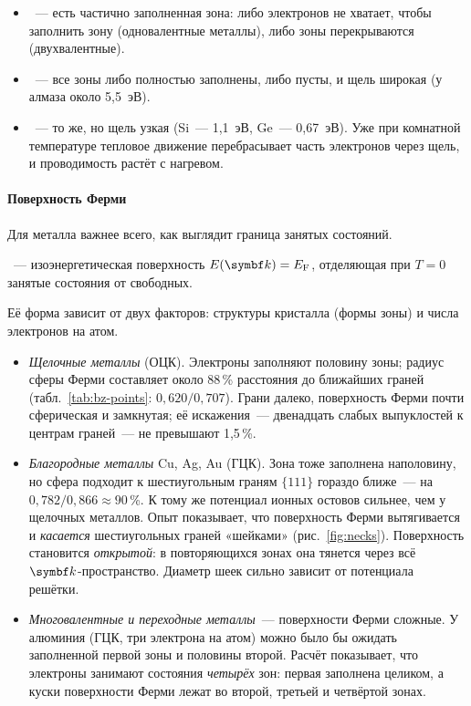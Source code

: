 \begin{itemize}
\item {}~— есть частично заполненная зона: либо электронов
не хватает, чтобы заполнить зону (одновалентные металлы), либо зоны
перекрываются (двухвалентные).
\item {}~— все зоны либо полностью заполнены, либо пусты,
и щель широкая (у алмаза около 5,5~эВ).
\item {}~— то же, но щель узкая (Si~— 1,1~эВ, Ge~—
0,67~эВ). Уже при комнатной температуре тепловое движение перебрасывает
часть электронов через щель, и проводимость растёт с нагревом.
\end{itemize}

\paragraph{Поверхность Ферми}
Для металла важнее всего, как выглядит граница занятых состояний.
\begin{opredelenie}
~— изоэнергетическая поверхность $E(\vb k)=\EF$,
отделяющая при $T=0$ занятые состояния от свободных.
\end{opredelenie}
Её форма зависит от двух факторов: структуры кристалла (формы зоны) и
числа электронов на атом.
\begin{itemize}
\item \emph{Щелочные металлы} (ОЦК). Электроны заполняют половину зоны;
радиус сферы Ферми составляет около 88\,\% расстояния до ближайших
граней (табл.~\ref{tab:bz-points}: $0{,}620/0{,}707$). Грани далеко,
поверхность Ферми почти сферическая и замкнутая; её искажения~—
двенадцать слабых выпуклостей к центрам граней~— не превышают 1,5\,\%.
\item \emph{Благородные металлы} Cu, Ag, Au (ГЦК). Зона тоже заполнена
наполовину, но сфера подходит к шестиугольным граням $\{111\}$ гораздо
ближе~— на $0{,}782/0{,}866\approx90$\,\%. К тому же потенциал ионных
остовов сильнее, чем у щелочных металлов. Опыт показывает, что
поверхность Ферми вытягивается и \emph{касается} шестиугольных граней
«шейками» (рис.~\ref{fig:necks}). Поверхность становится
\emph{открытой}: в повторяющихся зонах она тянется через всё
$\vb k$-пространство. Диаметр шеек сильно зависит от потенциала решётки.
\item \emph{Многовалентные и переходные металлы}~— поверхности Ферми
сложные. У алюминия (ГЦК, три электрона на атом) можно было бы
ожидать заполненной первой зоны и половины второй. Расчёт показывает,
что электроны занимают состояния \emph{четырёх} зон: первая заполнена
целиком, а куски поверхности Ферми лежат во второй, третьей и
четвёртой зонах.
\end{itemize}

